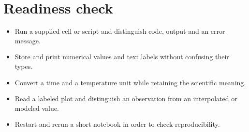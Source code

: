 \documentclass[11pt,letterpaper]{article}
\theoremstyle{definition}\newtheorem{definition}{Definition}\newtheorem{example}{Example}
\numberwithin{equation}{section}
\begin{document}
\section*{Readiness check}
\begin{itemize}
\item Run a supplied cell or script and distinguish code, output and an error message.
\item Store and print numerical values and text labels without confusing their types.
\item Convert a time and a temperature unit while retaining the scientific meaning.
\item Read a labeled plot and distinguish an observation from an interpolated or modeled value.
\item Restart and rerun a short notebook in order to check reproducibility.
\end{itemize}
\end{document}
